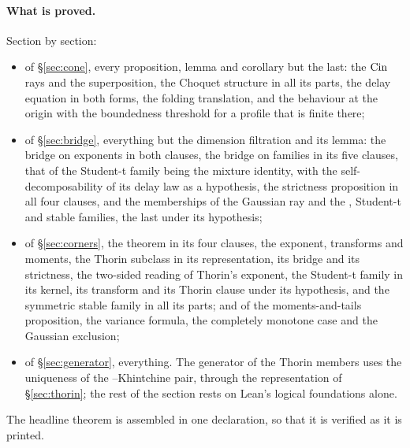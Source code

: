 \paragraph{What is proved.} Section by section:
\begin{itemize}
\item of \S\ref{sec:cone}, every proposition, lemma and corollary but the last: the $\operatorname{Cin}$
rays and the superposition, the Choquet structure in all its parts, the delay equation in both
forms, the folding translation, and the behaviour at the origin with the boundedness threshold
for a profile that is finite there;
\item of \S\ref{sec:bridge}, everything but the dimension filtration and its lemma: the bridge
on exponents in both clauses, the bridge on families in its five clauses, that of the Student-t
family being the mixture identity, with the self-decomposability of its delay law as a
hypothesis, the
strictness proposition in all four clauses, and the memberships of the Gaussian ray and the
\Matern{}, Student-t and stable families, the last under its hypothesis;
\item of \S\ref{sec:corners}, the \Matern{} theorem in its four clauses, the \Matern{}
exponent, transforms and moments, the Thorin subclass in its representation, its bridge and
its strictness, the two-sided reading of Thorin's exponent, the Student-t family in its
kernel, its transform and its Thorin clause under its hypothesis, and the symmetric stable
family in all its parts; and of the moments-and-tails proposition, the variance formula, the
completely monotone case and the Gaussian exclusion;
\item of \S\ref{sec:generator}, everything. The generator of the Thorin members uses the
uniqueness of the \Levy--Khintchine pair, through the representation of \S\ref{sec:thorin};
the rest of the section rests on Lean's logical foundations alone.
\end{itemize}
The headline theorem is assembled in one declaration, so that it is verified as it is printed.

